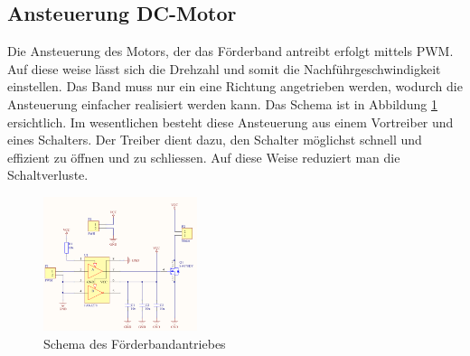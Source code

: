\subsection{Ansteuerung DC-Motor}
\label{sec:FoerderbandAnsteuerung}
    Die Ansteuerung des Motors, der das Förderband antreibt erfolgt mittels PWM. Auf diese 
    weise lässt sich die Drehzahl und somit die Nachführgeschwindigkeit einstellen. Das 
    Band muss nur ein eine Richtung angetrieben werden, wodurch die Ansteuerung einfacher 
    realisiert werden kann. Das Schema ist in Abbildung \ref{abb:SchemaAnsteuerung} 
    ersichtlich. Im wesentlichen besteht diese Ansteuerung aus einem Vortreiber und eines 
    Schalters. Der Treiber dient dazu, den Schalter möglichst schnell und effizient zu 
    öffnen und zu schliessen. Auf diese Weise reduziert man die Schaltverluste. 
    \begin{figure}[h!]
    	\includegraphics[width=0.4\textwidth,clip,trim=0mm 0mm 0mm 0mm]
    	{Enddokumentation/Bilder/Schema_DC-Ansteuerung.png}
    	\centering
    	\caption{Schema des Förderbandantriebes}
    	\label{abb:SchemaAnsteuerung}
    \end{figure}
    
\newpage